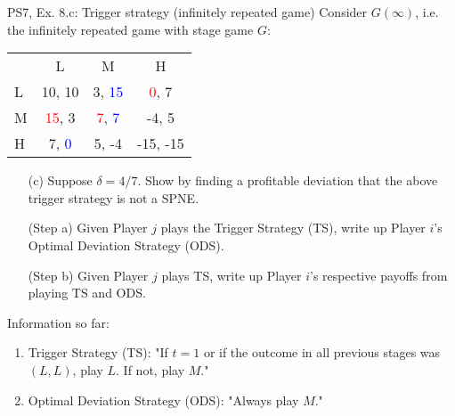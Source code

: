 \begin{frame}{PS7, Ex. 8.c: Trigger strategy (infinitely repeated game)}
    Consider $G(\infty)$, i.e. the infinitely repeated game with stage game $G$: \vspace{-6pt}
    \begin{table}
      \begin{tabular}{l|c|c|c|}
        \multicolumn{1}{c}{} & \multicolumn{1}{c}{L} & \multicolumn{1}{c}{M} & \multicolumn{1}{c}{H} \\\cline{2-4}
        L & 10, 10 & 3, \textcolor{blue}{15} & \textcolor{red}{0}, 7 \\\cline{2-4}
        M & \textcolor{red}{15}, 3 & \textcolor{red}{7}, \textcolor{blue}{7} & -4, 5 \\\cline{2-4}
        H & 7, \textcolor{blue}{0} & 5, -4 & -15, -15 \\\cline{2-4}
      \end{tabular}
    \end{table}
    \begin{itemize}
      \vspace{-4pt} \item[(c)] Suppose $\delta = 4/7$. Show by finding a profitable deviation that the above trigger strategy is not a SPNE. \vspace{-6pt}
    \end{itemize}
    \begin{multicols}{2}
      \begin{itemize}
        \item[(Step a)] Given Player $j$ plays the Trigger Strategy (TS), write up Player $i$'s Optimal Deviation Strategy (ODS).
        \item[(Step b)] Given Player $j$ plays TS, write up Player $i$'s respective payoffs from playing TS and ODS.
      \end{itemize}
      \vfill\null\columnbreak
      Information so far:
      \begin{enumerate}
        \item Trigger Strategy (TS): "If $t=1$ or if the outcome in all previous stages was $(L,L)$, play $L$. If not, play $M$."
        \item Optimal Deviation Strategy (ODS): "Always play $M$."
      \end{enumerate}
      \vfill\null
    \end{multicols}
\end{frame}
